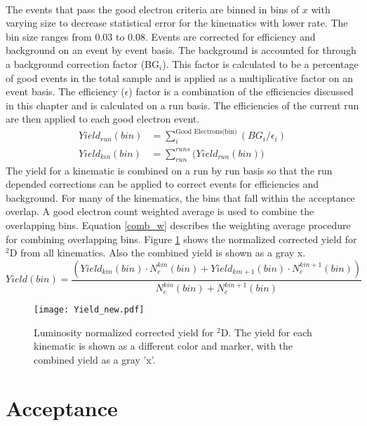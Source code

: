 \paragraph{}The events that pass the good electron criteria are binned in bins of $x$ with varying size to decrease statistical error for the kinematics with lower rate. The bin size ranges from 0.03 to 0.08. Events are corrected for efficiency and background on an event by event basis. The background is accounted for through a background correction factor (BG$_i$). This factor is calculated to be a percentage of good events in the total sample and is applied as a multiplicative factor on an event basis. The efficiency ($\epsilon$) factor is a combination of the efficiencies discussed in this chapter and is calculated on a run basis. The efficiencies of the current run are then applied to each good electron event. 
\begin{align}
Yield_{run}(bin) &= \sum_{i}^{\text{Good Electrons(bin)} } \left( BG_{i}/\epsilon_{i} \right) \nonumber\\
Yield_{kin}(bin) &= \sum_{run}^{runs} \bigg( Yield_{run}(bin) \bigg)
\end{align}
The yield for a kinematic is combined on a run by run basis so that the run depended corrections can be applied to correct events for efficiencies and background. For many of the kinematics, the bins that fall within the acceptance overlap. A good electron count weighted average is used to combine the overlapping bins. Equation \ref{comb_w} describes the weighting average procedure for combining overlapping bins. Figure \ref{kinYield} shows the normalized corrected yield for $^2$D from all kinematics. Also the combined yield is shown as a gray x. 
\begin{equation}
Yield(bin) = \frac{\left( Yield_{kin}(bin)\cdot N_e^{kin}(bin)+ Yield_{kin+1}(bin)\cdot N_e^{kin+1}(bin) \right)}{N_e^{kin}(bin)+N_e^{kin+1}(bin)} \label{comb_w}
\end{equation}
\begin{figure}[t]
	\centering
	\texttt{[image: Yield\_new.pdf]}
		\caption{Luminosity normalized corrected yield for $^2$D. The yield for each kinematic is shown as a different color and marker, with the combined yield as a gray 'x'.  \label{kinYield}}
\end{figure}
\section{Acceptance } 
